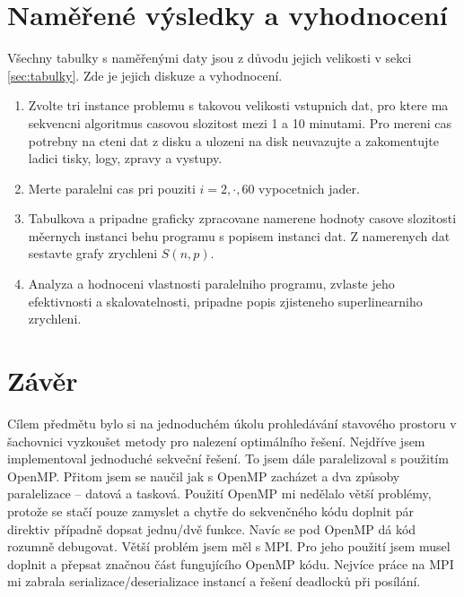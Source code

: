 \documentclass{article}
\begin{document}
    \pagebreak
    \label{sec:vysledky}
    
    \label{sec:namerene-vysledky}
    \section{Naměřené výsledky a vyhodnocení}

    Všechny tabulky s naměřenými daty jsou z důvodu jejich velikosti v sekci \ref{sec:tabulky}.
    Zde je jejich diskuze a vyhodnocení.


    \begin{enumerate}
        \item Zvolte tri instance problemu s takovou velikosti vstupnich dat, pro ktere ma sekvencni
        algoritmus casovou slozitost mezi 1 a 10 minutami.
        Pro mereni cas potrebny na cteni dat z disku a ulozeni na disk neuvazujte a zakomentujte
        ladici tisky, logy, zpravy a vystupy.
        \item Merte paralelni cas pri pouziti $i=2,\cdot,60$ vypocetnich jader.
        \item Tabulkova a pripadne graficky zpracovane namerene hodnoty casove slozitosti měernych instanci behu programu s popisem instanci dat. Z namerenych dat sestavte grafy zrychleni $S(n,p)$.
        \item Analyza a hodnoceni vlastnosti paralelniho programu, zvlaste jeho efektivnosti a skalovatelnosti, pripadne popis zjisteneho superlinearniho zrychleni.
    \end{enumerate}
    \section{Závěr}

    Cílem předmětu bylo si na jednoduchém úkolu prohledávání stavového prostoru v šachovnici vyzkoušet metody pro
    nalezení optimálního řešení. Nejdříve jsem implementoval jednoduché sekveční řešení. To jsem dále paralelizoval
    s použitím OpenMP. Přitom jsem se naučil jak s OpenMP zacházet a dva způsoby paralelizace – datová a tasková.
    Použití OpenMP mi nedělalo větší problémy, protože se stačí pouze zamyslet a chytře do sekvenčného kódu doplnit
    pár direktiv případně dopsat jednu/dvě funkce. Navíc se pod OpenMP dá kód rozumně debugovat. Větší problém jsem
    měl s MPI. Pro jeho použití jsem musel doplnit a přepsat značnou část fungujícího OpenMP kódu. Nejvíce práce na
    MPI mi zabrala serializace/deserializace instancí a řešení deadlocků při posílání.
\end{document}

